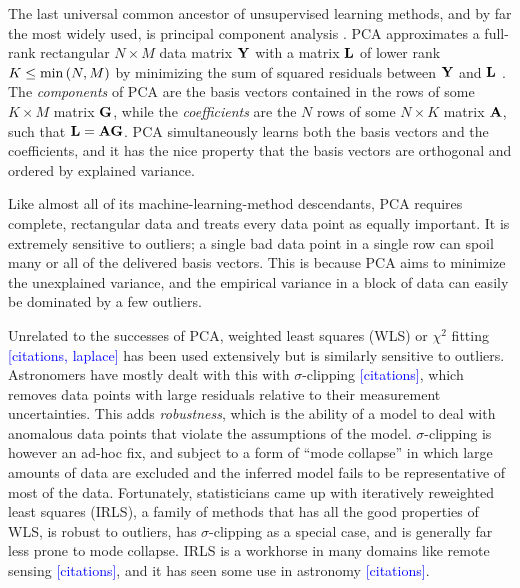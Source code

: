 \documentclass[onecolumn,floatfix]{aastex631}
\newcommand{\placeholder}[1]{\textcolor{blue}{[#1]}}
\begin{document}
The last universal common ancestor of unsupervised learning methods, and by far the most widely used, is principal component analysis \citep[PCA;][]{pearson1901,hotelling1933}.
PCA approximates a full-rank rectangular $N \times M$ data matrix ${\bf Y}$ with a matrix ${\bf L}$ of lower rank $K \le {\rm min} \, (N, M)$ by minimizing the sum of squared residuals between ${\bf Y}$ and ${\bf L}$ \citep{eckart1936}.
The \emph{components} of PCA are the basis vectors contained in the rows of some $K \times M$ matrix ${\bf G}$, while the \emph{coefficients} are the $N$ rows of some $N \times K$ matrix ${\bf A}$, such that ${\bf L} = {\bf A} {\bf G}$.
PCA simultaneously learns both the basis vectors and the coefficients, and it has the nice property that the basis vectors are orthogonal and ordered by explained variance.

Like almost all of its machine-learning-method descendants, PCA requires complete, rectangular data and treats every data point as equally important.
It is extremely sensitive to outliers; a single bad data point in a single row can spoil many or all of the delivered basis vectors.
This is because PCA aims to minimize the unexplained variance, and the empirical variance in a block of data can easily be dominated by a few outliers.

Unrelated to the successes of PCA, weighted least squares (WLS) or $\chi^2$ fitting \placeholder{citations, laplace} has been used extensively but is similarly sensitive to outliers.
Astronomers have mostly dealt with this with $\sigma$-clipping \placeholder{citations}, which removes data points with large residuals relative to their measurement uncertainties.
This adds \emph{robustness}, which is the ability of a model to deal with anomalous data points that violate the assumptions of the model.
$\sigma$-clipping is however an ad-hoc fix, and subject to a form of ``mode collapse'' in which large amounts of data are excluded and the inferred model fails to be representative of most of the data.
Fortunately, statisticians came up with iteratively reweighted least squares (IRLS), a family of methods that has all the good properties of WLS, is robust to outliers, has $\sigma$-clipping as a special case, and is generally far less prone to mode collapse.
IRLS is a workhorse in many domains like remote sensing \placeholder{citations}, and it has seen some use in astronomy \placeholder{citations}.
\end{document}
